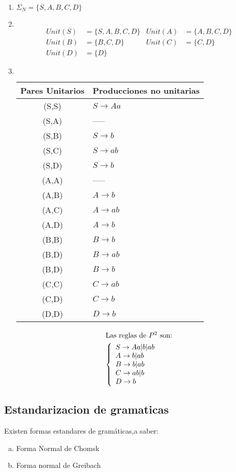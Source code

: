 \begin{enumerate}
\item $\Sigma_N =\{ S,A,B,C,D\}$
\item $\,$\\
\begin{align*}
Unit(S)	&=\{S,A,B,C,D\}	&Unit(A)	&=\{ A,B,C,D\}	\\
Unit(B)	&=\{B,C,D\}		&Unit(C)	&=\{C,D\}	\\
Unit(D)	&=\{D\}			&
\end{align*}
\item $\,$\\
\begin{tabular}{|c|l|}\hline
Pares Unitarios	&	Producciones no unitarias	\\ \hline
(S,S)			&	$S\rightarrow Aa$	\\
(S,A)			&	-----	\\
(S,B)			&	$S\rightarrow b$	\\
(S,C)			&	$S\rightarrow ab$	\\
(S,D)			&	$S\rightarrow b$	\\
(A,A)			&	-----	\\
(A,B)			&	$A\rightarrow b$	\\
(A,C)			&	$A\rightarrow ab$	\\
(A,D)			&	$A\rightarrow b$	\\
(B,B)			&	$B\rightarrow b$	\\
(B,D)			&	$B\rightarrow ab$	\\
(B,D)			&	$B\rightarrow b$	\\
(C,C)			&	$C\rightarrow ab$	\\
(C,D)			&	$C\rightarrow b$	\\
(D,D)			&	$D\rightarrow b$	\\ \hline
\end{tabular}
\begin{align*}
\intertext{Las reglas de $P^2$ son:}
\left \{ \begin{array}{l}
S\rightarrow Aa|b|ab	\\
A\rightarrow b|ab	\\
B\rightarrow b|ab	\\
C\rightarrow ab|b	\\
D\rightarrow b
\end{array}\right.
\end{align*}
\end{enumerate}

\subsection{Estandarizacion de gramaticas}

Existen formas estandares de gramáticas,a saber:
\begin{enumerate}[(a)]
\item Forma Normal de Chomsk
\item Forma normal de Greibach
\end{enumerate}